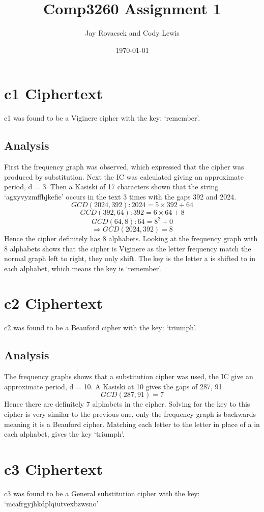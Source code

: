 \documentclass{article}
\title{Comp3260 Assignment 1}
\author{Jay Rovacsek and Cody Lewis}
\date{\today}
\begin{document}
  
    \maketitle
  
    \section{c1 Ciphertext}
    c1 was found to be a Viginere cipher with the key: `remember'.
      \subsection{Analysis}
      First the frequency graph was observed, which expressed that the cipher
      was produced by substitution. Next the IC was calculated giving an 
      approximate period, d = 3. Then a Kasiski of 17 characters shown that the
      string `agxyvyzmffhjkefie' occurs in the text 3 times with the gaps
      392 and 2024.
        \[ GCD(2024,392): 2024 = 5 \times 392 + 64 \] 
        \[ GCD(392,64): 392 = 6 \times 64 + 8 \] 
        \[ GCD(64,8): 64 = 8^2 + 0 \] 
        \[ \Rightarrow GCD(2024,392) = 8 \] 
      Hence the cipher definitely has 8 alphabets. Looking at the frequency 
      graph with 8 alphabets shows that the cipher is Viginere as the letter 
      frequency match the normal graph left to right, they only shift. The 
      key is the letter a is shifted to in each alphabet, which means the key 
      is `remember'.
    \section{c2 Ciphertext}
    c2 was found to be a Beauford cipher with the key: `triumph'.
      \subsection{Analysis}
      The frequency graphs shows that a substitution cipher was used, the IC
      give an approximate period, d = 10. A Kasiski at 10 gives the gaps of 287,
      91.
        \[ GCD(287,91) = 7 \]
      Hence there are definitely 7 alphabets in the cipher. Solving for the key
      to this cipher is very similar to the previous one, only the frequency 
      graph is backwards meaning it is a Beauford cipher. Matching each letter
      to the letter in place of a in each alphabet, gives the key `triumph'.
    \section{c3 Ciphertext}
      c3 was found to be a General substitution cipher with the key: `mcafrgyjhkdplqiutvexbzwsno'
\end{document}
